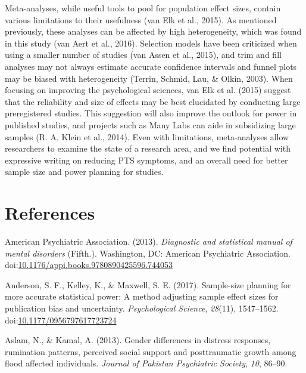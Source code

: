 \documentclass[man, mask]{apa6}
\theoremstyle{definition}
\theoremstyle{definition}
\theoremstyle{definition}
\theoremstyle{remark}
\begin{document}
Meta-analyses, while useful tools to pool for population effect sizes,
contain various limitations to their usefulness (van Elk et al., 2015).
As mentioned previously, these analyses can be affected by high
heterogeneity, which was found in this study (van Aert et al., 2016).
Selection models have been criticized when using a smaller number of
studies (van Assen et al., 2015), and trim and fill analyses may not
always estimate accurate confidence intervals and funnel plots may be
biased with heterogeneity (Terrin, Schmid, Lau, \& Olkin, 2003). When
focusing on improving the psychological sciences, van Elk et al. (2015)
suggest that the reliability and size of effects may be best elucidated
by conducting large preregistered studies. This suggestion will also
improve the outlook for power in published studies, and projects such as
Many Labs can aide in subsidizing large samples (R. A. Klein et al.,
2014). Even with limitations, meta-analyses allow researchers to examine
the state of a research area, and we find potential with expressive
writing on reducing PTS symptoms, and an overall need for better sample
size and power planning for studies.

\newpage

\section{References}\label{references}

\setlength{\parindent}{-0.5in} \setlength{\leftskip}{0.5in}

\hypertarget{refs}{}
\hypertarget{ref-AmericanPsychiatricAssociation2013}{}
American Psychiatric Association. (2013). \emph{Diagnostic and
statistical manual of mental disorders} (Fifth.). Washington, DC:
American Psychiatric Association.
doi:\href{https://doi.org/10.1176/appi.books.9780890425596.744053}{10.1176/appi.books.9780890425596.744053}

\hypertarget{ref-Anderson2017a}{}
Anderson, S. F., Kelley, K., \& Maxwell, S. E. (2017). Sample-size
planning for more accurate statistical power: A method adjusting sample
effect sizes for publication bias and uncertainty. \emph{Psychological
Science}, \emph{28}(11), 1547--1562.
doi:\href{https://doi.org/10.1177/0956797617723724}{10.1177/0956797617723724}

\hypertarget{ref-Aslam2013}{}
Aslam, N., \& Kamal, A. (2013). Gender differences in distress
responses, rumination patterns, perceived social support and
posttraumatic growth among flood affected individuals. \emph{Journal of
Pakistan Psychiatric Society}, \emph{10}, 86--90.
\end{document}
